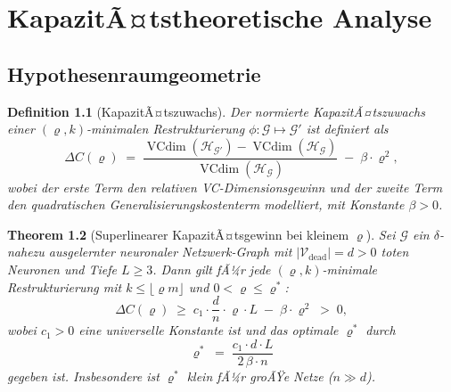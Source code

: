﻿\documentclass[12pt, a4paper, openany]{report}
\newtheorem{theorem}{Theorem}[chapter]
\newtheorem{definition}[theorem]{Definition}
\newcommand{\calG}{\mathcal{G}}
\newcommand{\calH}{\mathcal{H}}
\newcommand{\calV}{\mathcal{V}}
\DeclareMathOperator{\VC}{VCdim}
\begin{document}
\chapter{KapazitÃ¤tstheoretische Analyse}
\label{sec:capacity}

\section{Hypothesenraumgeometrie}

\begin{definition}[KapazitÃ¤tszuwachs]
\label{def:capacity}
Der \emph{normierte KapazitÃ¤tszuwachs} einer $(\varrho, k)$-minimalen
Restrukturierung $\phi : \calG \mapsto \calG'$ ist definiert als
\begin{equation}
  \label{eq:deltaC}
  \Delta C(\varrho) \;=\;
  \frac{\VC(\calH_{\calG'}) - \VC(\calH_{\calG})}{\VC(\calH_{\calG})}
  \;-\; \beta \cdot \varrho^2,
\end{equation}
wobei der erste Term den relativen VC-Dimensionsgewinn und der zweite Term
den quadratischen Generalisierungskostenterm modelliert, mit Konstante
$\beta > 0$.
\end{definition}

\begin{theorem}[Superlinearer KapazitÃ¤tsgewinn bei kleinem $\varrho$]
\label{thm:main}
Sei $\calG$ ein $\delta$-nahezu ausgelernter neuronaler Netzwerk-Graph mit
$|\calV_{\mathrm{dead}}| = d > 0$ toten Neuronen und Tiefe $L \geq 3$.
Dann gilt fÃ¼r jede $(\varrho, k)$-minimale Restrukturierung mit
$k \leq \lfloor\varrho m\rfloor$ und $0 < \varrho \leq \varrho^*$:
\begin{equation}
  \label{eq:main_thm}
  \Delta C(\varrho)
  \;\geq\;
  c_1 \cdot \frac{d}{n} \cdot \varrho \cdot L
  \;-\; \beta \cdot \varrho^2
  \;>\; 0,
\end{equation}
wobei $c_1 > 0$ eine universelle Konstante ist und das optimale
$\varrho^*$ durch
\begin{equation}
  \label{eq:rho_opt}
  \varrho^*
  \;=\;
  \frac{c_1 \cdot d \cdot L}{2\,\beta \cdot n}
\end{equation}
gegeben ist.  Insbesondere ist $\varrho^*$ \emph{klein} fÃ¼r groÃŸe Netze ($n \gg d$).
\end{theorem}
\end{document}
